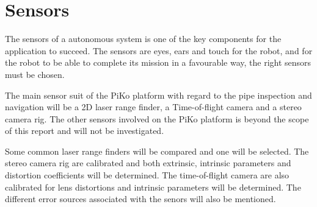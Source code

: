 

\chapter{Sensors}
\label{chap3-sensors}
The sensors of a autonomous system is one of the key components for the application to
succeed. The sensors are eyes, ears and touch for the robot, and for the robot to be able
to complete its mission in a favourable way, the right sensors must be chosen.

The main sensor suit of the PiKo platform with regard to the pipe inspection and
navigation will be a 2D laser range finder, a Time-of-flight camera and a stereo camera
rig. The other sensors involved on the PiKo platform is beyond the scope of this report
and will not be investigated. 

Some common laser range finders will be compared and one will be selected. The stereo
camera rig are calibrated and both extrinsic, intrinsic parameters and distortion
coefficients will be determined. The time-of-flight camera are also calibrated for lens
distortions and intrinsic parameters will be determined. The different error sources associated
with the senors will also be mentioned.


